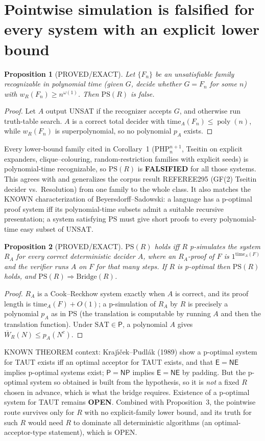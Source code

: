 \documentclass[11pt]{article}
\newtheorem{proposition}{Proposition}
\newcommand{\SAT}{\mathrm{SAT}}
\newcommand{\UNSAT}{\mathrm{UNSAT}}
\newcommand{\Pc}{\mathsf P}
\newcommand{\NP}{\mathsf{NP}}
\newcommand{\poly}{\operatorname{poly}}
\begin{document}
\section{Pointwise simulation is falsified for every system with an explicit lower bound}
\begin{proposition}[PROVED/EXACT]
Let $\{F_n\}$ be an unsatisfiable family recognizable in polynomial time
(given $G$, decide whether $G=F_n$ for some $n$) with $w_R(F_n)\ge n^{\omega(1)}$.
Then $\mathrm{PS}(R)$ is false.
\end{proposition}
\begin{proof}
Let $A$ output UNSAT if the recognizer accepts $G$, and otherwise run truth-table search.
$A$ is a correct total decider with $\mathrm{time}_A(F_n)\le\poly(n)$, while
$w_R(F_n)$ is superpolynomial, so no polynomial $p_A$ exists.
\end{proof}
Every lower-bound family cited in Corollary~1 (PHP$^{n+1}_n$, Tseitin on explicit expanders,
clique--colouring, random-restriction families with explicit seeds) is polynomial-time recognizable,
so $\mathrm{PS}(R)$ is \textbf{FALSIFIED} for all those systems. This agrees with and generalizes the
corpus result REFEREE295 (GF(2) Tseitin decider vs.\ Resolution) from one family to the whole class.
It also matches the KNOWN characterization of Beyersdorff--Sadowski: a language has a p-optimal
proof system iff its polynomial-time subsets admit a suitable recursive presentation; a system
satisfying $\mathrm{PS}$ must give short proofs to every polynomial-time easy subset of $\UNSAT$.

\begin{proposition}[PROVED/EXACT]
$\mathrm{PS}(R)$ holds iff $R$ p-simulates the system $R_A$ for every correct deterministic decider $A$,
where an $R_A$-proof of $F$ is $1^{\mathrm{time}_A(F)}$ and the verifier runs $A$ on $F$ for that many steps.
If $R$ is p-optimal then $\mathrm{PS}(R)$ holds, and $\mathrm{PS}(R)\Rightarrow\mathrm{Bridge}(R)$.
\end{proposition}
\begin{proof}
$R_A$ is a Cook--Reckhow system exactly when $A$ is correct, and its proof length is $\mathrm{time}_A(F)+O(1)$;
a p-simulation of $R_A$ by $R$ is precisely a polynomial $p_A$ as in PS (the translation is computable by
running $A$ and then the translation function). Under $\SAT\in\Pc$, a polynomial $A$ gives
$\overline W_R(N)\le p_A(N^{c})$.
\end{proof}
KNOWN THEOREM context: Kraj\'{\i}\v{c}ek--Pudlák (1989) show a p-optimal system for TAUT exists iff an
optimal acceptor for TAUT exists, and that $\mathsf E=\mathsf{NE}$ implies p-optimal systems exist;
$\Pc=\NP$ implies $\mathsf E=\mathsf{NE}$ by padding. But the p-optimal system so obtained is built from the
hypothesis, so it is \emph{not} a fixed $R$ chosen in advance, which is what the bridge requires.
Existence of a p-optimal system for TAUT remains \textbf{OPEN}.
Combined with Proposition~3, the pointwise route survives only for $R$ with no explicit-family lower bound,
and its truth for such $R$ would need $R$ to dominate all deterministic algorithms (an optimal-acceptor-type
statement), which is OPEN.
\end{document}
